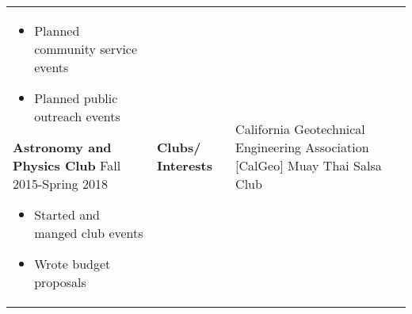 \documentclass[10pt]{article}
\newcommand*\leftright[2]{%
  \leavevmode
  \rlap{#1}%
  \hspace{0.5\linewidth}%
  #2}
\begin{document}
\begin{tabular}{l l l l}
{        \begin{itemize}[noitemsep,nolistsep]
            \item Planned community service events
            \item Planned public outreach events
        \end{itemize}
        \textbf{Astronomy and Physics Club} \newline
        \leftright{\textit{President}}{Fall 2015-Spring 2018}
        \begin{itemize}[noitemsep,nolistsep]
            \item Started and manged club events
            \item Wrote budget proposals
        \end{itemize}}  &
            \multicolumn{1}{p{1cm}}{\textbf{Clubs/ \newline Interests}}   &
                \multicolumn{1}{p{6cm}}{
                California Geotechnical Engineering Association [CalGeo] \newline
                Muay Thai \newline
                Salsa Club
                }
\end{tabular}
\end{document}
